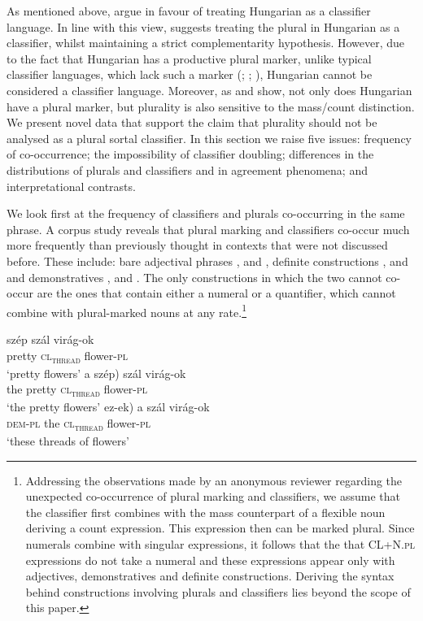 \documentclass[output=paper]{langscibook}
\begin{document}
As mentioned above, \citet{csirmaz-dekany-14} argue in favour of treating Hungarian as a classifier language. In line with this view, \citet{dekany-11} suggests treating the plural in Hungarian as a classifier, whilst maintaining a strict complementarity hypothesis.  However, due to the fact that Hungarian has a productive plural marker, unlike typical classifier languages, which lack such a marker
(\citealt{chierchia-98a}; \citeyear{Chierchia-2010}; \citealt{cheng-sybesma-99}), Hungarian cannot be considered a classifier language. Moreover, as \citet{schvarcz-14} and \citet{schvarcz-rothstein-17} show, not only does Hungarian have a plural marker, but plurality is also sensitive to the mass/count distinction. We present novel data that support the claim that plurality should not be analysed as a plural sortal classifier.  In this section we raise five issues: frequency of co-occurrence; the impossibility of classifier doubling; differences in the distributions of plurals and classifiers and in agreement phenomena; and interpretational contrasts.

We look first at the frequency of classifiers and plurals co-occurring in the same phrase. A corpus study reveals that plural marking and classifiers co-occur much more frequently than previously thought in contexts that were not discussed before. These include: bare adjectival phrases ,  and , definite constructions ,  and  and demonstratives ,  and . The only constructions in which the two cannot co-occur are the ones that contain either a numeral or a quantifier, which cannot combine with plural-marked nouns at any rate.\footnote{Addressing the observations made by an anonymous reviewer regarding the unexpected co-occurrence of plural marking and classifiers, we assume that the classifier first combines with the mass counterpart of a flexible noun deriving a count expression. This expression then can be marked plural. Since numerals combine with singular expressions, it follows that the  that CL+N.\textsc{pl} expressions do not take a numeral and these expressions appear only with adjectives, demonstratives and definite constructions. Deriving the syntax behind constructions involving plurals and classifiers lies beyond the scope of this paper.}

\ea \label{schv-nem:ex:20}
\ea \label{schv-nem:ex:20a}
\gll szép szál virág-ok \\  
pretty \textsc{cl\textsubscript{thread}} flower-\textsc{pl}\\ 
\glt `pretty flowers'
\ex \label{schv-nem:ex:20b}
\gll a \minsp{(} szép) szál virág-ok\\
the {} pretty \textsc{cl\textsubscript{thread}} flower-\textsc{pl}\\
\glt `the pretty flowers'
\ex \label{schv-nem:ex:20c}
\gll \minsp{(} ez-ek) a szál virág-ok \\
{} \textsc{dem}-\textsc{pl} the \textsc{cl\textsubscript{thread}} flower-\textsc{pl}\\
\glt `these threads of flowers'
\z
\z
\end{document}
